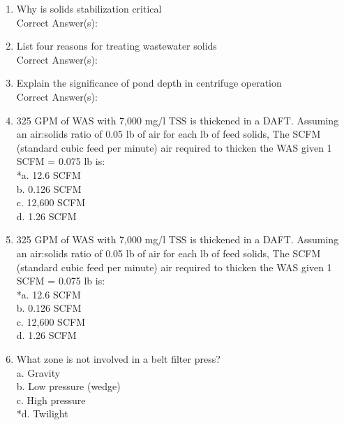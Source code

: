 \documentclass{article}
\begin{document}
\begin{enumerate}
\item  Why is solids stabilization critical \\

Correct Answer(s): \\

\item  List four reasons for treating wastewater solids \\

Correct Answer(s): \\

\item  Explain the significance of pond depth in centrifuge operation \\

Correct Answer(s): \\

\item  325 GPM of WAS with 7,000 mg/l TSS is thickened in a DAFT. Assuming an air:solids ratio of 0.05 lb of air for each lb of feed solids, The SCFM (standard cubic feed per minute) air required to thicken the WAS given 1 SCFM = 0.075 lb is: \\

*a. 12.6 SCFM \\
b. 0.126 SCFM \\
c. 12,600 SCFM \\
d. 1.26 SCFM \\

\item  325 GPM of WAS with 7,000 mg/l TSS is thickened in a DAFT. Assuming an air:solids ratio of 0.05 lb of air for each lb of feed solids, The SCFM (standard cubic feed per minute) air required to thicken the WAS given 1 SCFM = 0.075 lb is: \\

*a. 12.6 SCFM \\
b. 0.126 SCFM \\
c. 12,600 SCFM \\
d. 1.26 SCFM \\






\item  What zone is not involved in a belt filter press? \\

a. Gravity \\
b. Low pressure (wedge) \\
c. High pressure \\
*d. Twilight \\


\end{enumerate}
\end{document}
